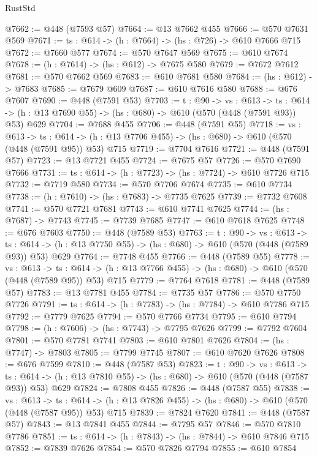 \begin{lexlean}{RustStd}
\begin{coremodule}
@7662 := @448 (@7593 @57)
@7664 := @13 @7662 @455
@7666 := @570 @7631 @569
@7671 := {ts : @614} -> (h : @7664) -> (hs : @726) -> @610 @7666 @715
@7672 := @7660 @577
@7674 := @570 @7647 @569
@7675 := @610 @7674
@7678 := (h : @7614) -> (hs : @612) -> @7675 @580
@7679 := @7672 @7612
@7681 := @570 @7662 @569
@7683 := @610 @7681 @580
@7684 := (hs : @612) -> @7683
@7685 := @7679 @609
@7687 := @610 @7616 @580
@7688 := @676 @7607
@7690 := @448 (@7591 @53)
@7703 := {t : @90} ->
  {vs : @613} ->
  {ts : @614} -> (h : @13 @7690 @55) -> (hs : @680) -> @610 (@570 (@448 (@7591 @93)) @53) @629
@7704 := @7688 @455
@7706 := @448 (@7591 @55)
@7718 := {vs : @613} ->
  {ts : @614} -> (h : @13 @7706 @455) -> (hs : @680) -> @610 (@570 (@448 (@7591 @95)) @53) @715
@7719 := @7704 @7616
@7721 := @448 (@7591 @57)
@7723 := @13 @7721 @455
@7724 := @7675 @57
@7726 := @570 @7690 @7666
@7731 := {ts : @614} -> (h : @7723) -> (hs : @7724) -> @610 @7726 @715
@7732 := @7719 @580
@7734 := @570 @7706 @7674
@7735 := @610 @7734
@7738 := (h : @7610) -> (hs : @7683) -> @7735 @7625
@7739 := @7732 @7608
@7741 := @570 @7721 @7681
@7743 := @610 @7741 @7625
@7744 := (hs : @7687) -> @7743
@7745 := @7739 @7685
@7747 := @610 @7618 @7625
@7748 := @676 @7603
@7750 := @448 (@7589 @53)
@7763 := {t : @90} ->
  {vs : @613} ->
  {ts : @614} -> (h : @13 @7750 @55) -> (hs : @680) -> @610 (@570 (@448 (@7589 @93)) @53) @629
@7764 := @7748 @455
@7766 := @448 (@7589 @55)
@7778 := {vs : @613} ->
  {ts : @614} -> (h : @13 @7766 @455) -> (hs : @680) -> @610 (@570 (@448 (@7589 @95)) @53) @715
@7779 := @7764 @7618
@7781 := @448 (@7589 @57)
@7783 := @13 @7781 @455
@7784 := @7735 @57
@7786 := @570 @7750 @7726
@7791 := {ts : @614} -> (h : @7783) -> (hs : @7784) -> @610 @7786 @715
@7792 := @7779 @7625
@7794 := @570 @7766 @7734
@7795 := @610 @7794
@7798 := (h : @7606) -> (hs : @7743) -> @7795 @7626
@7799 := @7792 @7604
@7801 := @570 @7781 @7741
@7803 := @610 @7801 @7626
@7804 := (hs : @7747) -> @7803
@7805 := @7799 @7745
@7807 := @610 @7620 @7626
@7808 := @676 @7599
@7810 := @448 (@7587 @53)
@7823 := {t : @90} ->
  {vs : @613} ->
  {ts : @614} -> (h : @13 @7810 @55) -> (hs : @680) -> @610 (@570 (@448 (@7587 @93)) @53) @629
@7824 := @7808 @455
@7826 := @448 (@7587 @55)
@7838 := {vs : @613} ->
  {ts : @614} -> (h : @13 @7826 @455) -> (hs : @680) -> @610 (@570 (@448 (@7587 @95)) @53) @715
@7839 := @7824 @7620
@7841 := @448 (@7587 @57)
@7843 := @13 @7841 @455
@7844 := @7795 @57
@7846 := @570 @7810 @7786
@7851 := {ts : @614} -> (h : @7843) -> (hs : @7844) -> @610 @7846 @715
@7852 := @7839 @7626
@7854 := @570 @7826 @7794
@7855 := @610 @7854

\end{coremodule}
\end{lexlean}
